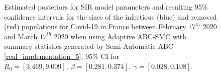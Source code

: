 \documentclass[11pt,a4paper]{article}
\theoremstyle{break}
\begin{document}
  \begin{figure}[H]
    \centering
    \caption{Estimated posteriors for SIR model parameters and resulting 95\% confidence intervals for the sizes of the infectious (blue) and removed (red) populations for Covid-19 in France between February $17^{th}$ 2020 and March $17^{th}$ 2020 when using Adaptive ABC-SMC with summary statistics generated by Semi-Automatic ABC \ref{real_implementation_5}. 95\% CI for $R_0=[3.469,9.009],\ \beta=[0.281,0.374],\ \gamma=[0.028,0.108]$.}
    \label{fig_france_semi_auto}
  \end{figure}
\end{document}
